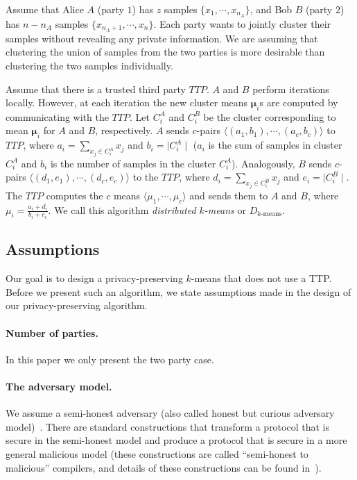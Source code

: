 Assume that Alice $A$ (party $1$) has $z$ samples $\{
x_1,\cdots,x_{n_A} \}$, and Bob $B$ (party $2$) has $n-n_A$ samples
$\{ x_{n_A + 1},\cdots,x_n \}$. Each party wants to jointly cluster
their samples without revealing any private information. We are
assuming that clustering the union of samples from the two parties is
more desirable than clustering the two samples individually.

Assume that there is a trusted third party $TTP$. $A$ and $B$ perform
iterations locally. However, at each iteration the new cluster means
$\mathbf{\mu}_i$s are computed by communicating with the $TTP$. Let
$C_i^A$ and $C_i^B$ be the cluster corresponding to mean
$\mathbf{\mu}_i$ for $A$ and $B$, respectively.  $A$ sends $c$-pairs
$\langle (a_1,b_1), \cdots, (a_c,b_c) \rangle$ to $TTP$, where $a_i =
\sum_{x_j \in C_i^A } x_j$ and $b_i = \mid C_i^A \mid$ ($a_i$ is the sum of
samples in cluster $C_i^A$ and $b_i$ is the number of samples in the
cluster $C_i^A$). Analogously, $B$ sends $c$-pairs $\langle (d_1,e_1),
\cdots, (d_c,e_c) \rangle$ to the $TTP$, where $d_i = \sum_{x_j \in
C_i^B } x_j$ and $e_i = \mid C_i^B \mid$. The $TTP$ computes the $c$
means $\langle \mu_1, \cdots, \mu_c \rangle$ and sends them to $A$ and
$B$, where $\mu_i = \frac{a_i+d_i}{b_i+e_i}$. We call this algorithm
{\em distributed $k$-means} or $D_{\mbox{$k$-means}}$.

\subsection{Assumptions}

Our goal is to design a privacy-preserving $k$-means that does not
use a TTP. Before we present such an algorithm, we state assumptions
made in the design of our  privacy-preserving algorithm.

\paragraph{Number of parties.} In this paper we only present the
two party case. 

\paragraph{The adversary model.} We assume a  semi-honest
adversary (also called honest but curious adversary model)~\cite{Goldreich:vol2}.
There are standard constructions that transform a protocol that
is secure in the semi-honest model and produce a protocol that is
secure in a more general malicious model (these constructions are
called ``semi-honest to malicious'' compilers, and details of these
constructions can be found in~\cite{Goldreich:compiler:99}).

